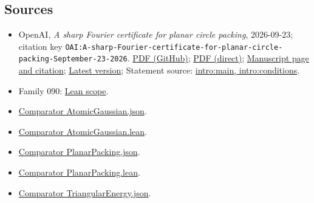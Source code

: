 \documentclass[11pt]{article}
\begin{document}
\subsection{Sources}
\begin{itemize}
\item OpenAI, \emph{A sharp Fourier certificate for planar circle packing}, 2026-09-23; citation key \texttt{OAI:A-sharp-Fourier-certificate-for-planar-circle-packing-September-23-2026}. \href{https://github.com/openai/math/blob/adc7f1241b42e322a6451854ab7e4b4c146bf78a/preprints/A-sharp-Fourier-certificate-for-planar-circle-packing-September-23-2026/paper.pdf}{PDF (GitHub)}; \href{https://github.com/openai/math/raw/adc7f1241b42e322a6451854ab7e4b4c146bf78a/preprints/A-sharp-Fourier-certificate-for-planar-circle-packing-September-23-2026/paper.pdf}{PDF (direct)}; \href{https://github.com/openai/math/blob/adc7f1241b42e322a6451854ab7e4b4c146bf78a/preprints/A-sharp-Fourier-certificate-for-planar-circle-packing-September-23-2026/README.md}{Manuscript page and citation}; \href{https://github.com/openai/math/blob/main/preprints/A-sharp-Fourier-certificate-for-planar-circle-packing-September-23-2026/paper.pdf}{Latest version}; Statement source: \href{https://github.com/openai/math/blob/adc7f1241b42e322a6451854ab7e4b4c146bf78a/preprints/A-sharp-Fourier-certificate-for-planar-circle-packing-September-23-2026/build/sections/introduction.tex\#L34}{intro:main, intro:conditions}.
\item Family 090: \href{https://github.com/openai/math/blob/adc7f1241b42e322a6451854ab7e4b4c146bf78a/lean/docs/090.md}{Lean scope}.
\item \href{https://github.com/openai/math/blob/adc7f1241b42e322a6451854ab7e4b4c146bf78a/lean/ComparatorChallenges/AtomicGaussian.json}{Comparator AtomicGaussian.json}.
\item \href{https://github.com/openai/math/blob/adc7f1241b42e322a6451854ab7e4b4c146bf78a/lean/ComparatorChallenges/AtomicGaussian.lean}{Comparator AtomicGaussian.lean}.
\item \href{https://github.com/openai/math/blob/adc7f1241b42e322a6451854ab7e4b4c146bf78a/lean/ComparatorChallenges/PlanarPacking.json}{Comparator PlanarPacking.json}.
\item \href{https://github.com/openai/math/blob/adc7f1241b42e322a6451854ab7e4b4c146bf78a/lean/ComparatorChallenges/PlanarPacking.lean}{Comparator PlanarPacking.lean}.
\item \href{https://github.com/openai/math/blob/adc7f1241b42e322a6451854ab7e4b4c146bf78a/lean/ComparatorChallenges/TriangularEnergy.json}{Comparator TriangularEnergy.json}.

\end{itemize}
\end{document}
